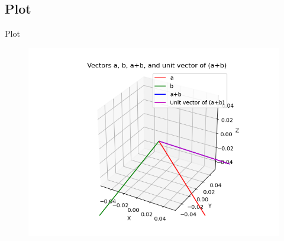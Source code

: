 \documentclass{beamer}
\theoremstyle{remark}
\numberwithin{equation}{section}
\begin{document}
\subsection{Plot}
\begin{frame}{Plot}
 \begin{figure}[H]
    \centering
    \includegraphics[width=\columnwidth]{../figs/plot2.png}
    \caption*{}
    \label{fig:plot_c}
\end{figure}
\end{frame}
\end{document}
